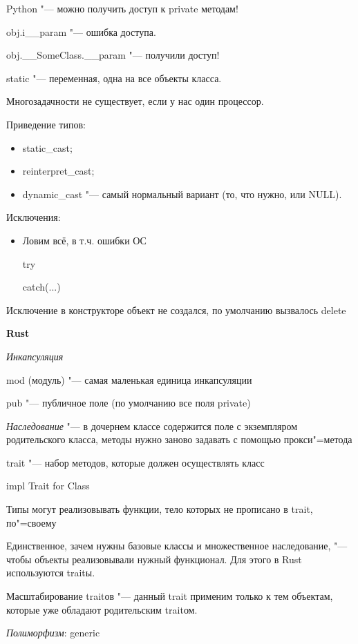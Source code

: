 \documentclass[12pt]{article}
\begin{document}
Python "--- можно получить доступ к private методам!

obj.i\_\_param "--- ошибка доступа.

obj.\_\_SomeClass.\_\_param "--- получили доступ!

static "--- переменная, одна на все объекты класса.

Многозадачности не существует, если у нас один процессор.

Приведение типов:
\begin{itemize}
\item static\_cast;
\item reinterpret\_cast;
\item dynamic\_cast "--- самый нормальный вариант (то, что нужно, или NULL).
\end{itemize}

Исключения:
\begin{itemize}
\item Ловим всё, в т.ч. ошибки ОС

try {

}

catch(...) {

}

\end{itemize}

\item Исключение в конструкторе \rightarrow объект не создался, по умолчанию вызвалось delete

\textbf{Rust}

\textit{Инкапсуляция}

mod (модуль) "--- самая маленькая единица инкапсуляции

pub "--- публичное поле (по умолчанию все поля private)

\textit{Наследование} "--- в дочернем классе содержится поле с экземпляром родительского класса, методы нужно заново задавать с помощью прокси"=метода

trait "--- набор методов, которые должен осуществлять класс

impl Trait for Class

Типы могут реализовывать функции, тело которых не прописано в trait, по"=своему

Единственное, зачем нужны базовые классы и множественное наследование, "--- чтобы объекты реализовывали нужный функционал. Для этого в Rust используются traitы.

Масштабирование traitов "--- данный trait применим только к тем объектам, которые уже обладают родительским traitом.

\textit{Полиморфизм}: generic
\end{document}
